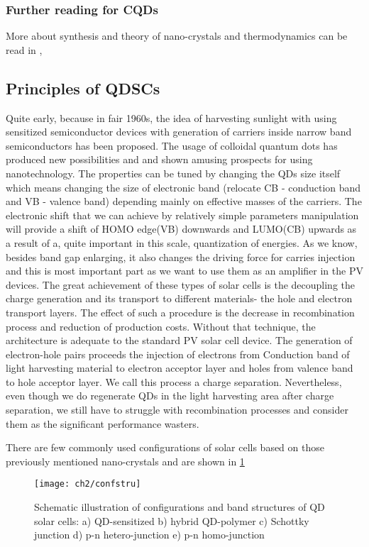 \subsubsection{Further reading for CQDs}
More about synthesis and theory of nano-crystals and thermodynamics can be read in \cite{Klimov}, \cite{crystal}

\subsection{Principles of QDSCs}
Quite early, because in fair 1960s, the idea of harvesting sunlight with using sensitized semiconductor devices with generation of carriers inside narrow band semiconductors has been proposed. The usage of colloidal quantum dots has produced new possibilities and and shown amusing prospects for using nanotechnology. The properties can be tuned by changing the QDs size itself which means changing the size of electronic band (relocate CB - conduction band and VB - valence band) depending mainly on effective masses of the carriers. The electronic shift that we can achieve by relatively simple parameters manipulation will provide a shift of HOMO edge(VB) downwards and LUMO(CB) upwards as a result of a, quite important in this scale, quantization of energies. As we know, besides band gap enlarging, it also changes the driving force for carries injection and this is most important part as we want to use them as an amplifier in the PV devices. The great achievement of these types of solar cells is the decoupling the charge generation and its transport to different materials- the hole and electron transport layers. The effect of such a procedure is the decrease in recombination process and reduction of production costs.  Without that technique, the architecture is adequate to the standard PV solar cell device. The generation of electron-hole pairs proceeds the injection of electrons from Conduction band of light harvesting material to electron acceptor layer and holes from valence band to hole acceptor layer. We call this process a charge separation. Nevertheless, even though we do regenerate QDs in the light harvesting area after charge separation, we still have to struggle with recombination processes and consider them as the significant performance wasters. \cite{S.Gimenez2009}


There are few commonly used configurations of solar cells based on those previously mentioned nano-crystals and are shown in \ref{fig:confstru}

\begin{figure}[h]
\centering
\texttt{[image: ch2/confstru]}
\caption{Schematic illustration of configurations and band structures of QD solar cells: a) QD-sensitized b) hybrid QD-polymer c) Schottky junction d) p-n hetero-junction e) p-n homo-junction \cite{HuashangRao2018}}
\label{fig:confstru}
\end{figure}

